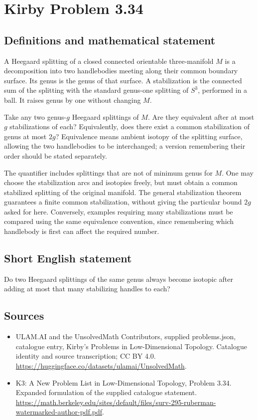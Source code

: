 \documentclass[11pt,a4paper]{article}
\begin{document}
\section*{Kirby Problem 3.34}\label{statement}

\subsection{Definitions and mathematical statement}
A Heegaard splitting of a closed connected orientable three-manifold $M$
is a decomposition into two handlebodies meeting along their common
boundary surface. Its genus is the genus of that surface. A stabilization
is the connected sum of the splitting with the standard genus-one splitting
of $S^3$, performed in a ball. It raises genus by one without changing $M$.

Take any two genus-$g$ Heegaard splittings of $M$. Are they equivalent
after at most $g$ stabilizations of each? Equivalently, does there exist a
common stabilization of genus at most $2g$? Equivalence means ambient
isotopy of the splitting surface, allowing the two handlebodies to be
interchanged; a version remembering their order should be stated separately.

The quantifier includes splittings that are not of minimum genus for $M$.
One may choose the stabilization arcs and isotopies freely, but must obtain
a common stabilized splitting of the original manifold. The general
stabilization theorem guarantees a finite common stabilization, without
giving the particular bound $2g$ asked for here. Conversely, examples
requiring many stabilizations must be compared using the same equivalence
convention, since remembering which handlebody is first can affect the
required number.
\subsection{Short English statement}
Do two Heegaard splittings of the same genus always become isotopic after adding at most that many stabilizing handles to each?
\subsection{Sources}
\begin{itemize}
\item[S1] ULAM.AI and the UnsolvedMath Contributors, supplied problems.json, catalogue entry, Kirby's Problems in Low-Dimensional Topology. Catalogue identity and source transcription; CC BY 4.0.
\url{https://huggingface.co/datasets/ulamai/UnsolvedMath}.
\item[S2] K3: A New Problem List in Low-Dimensional Topology, Problem 3.34. Expanded formulation of the supplied catalogue statement.
\url{https://math.berkeley.edu/sites/default/files/surv-295-ruberman-watermarked-author-pdf.pdf}.
\end{itemize}
\end{document}
